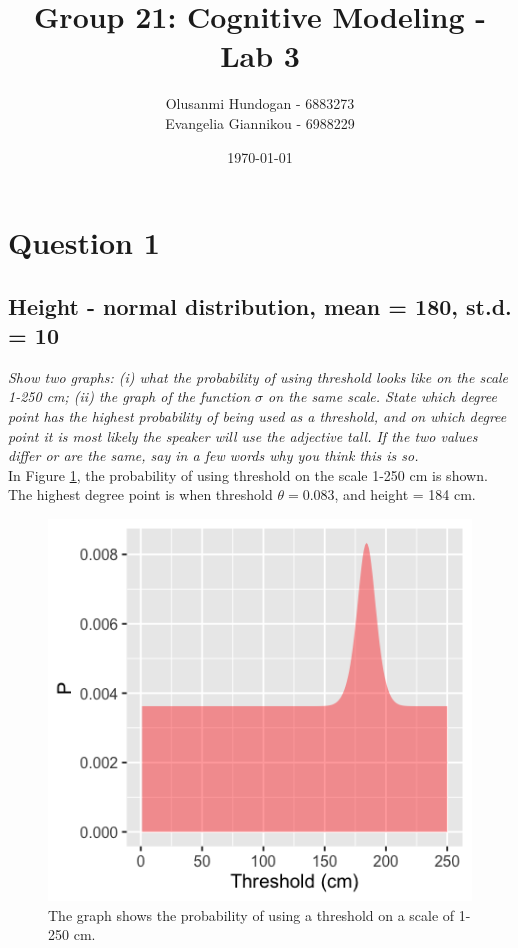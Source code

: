 \documentclass[11pt,a4paper,oneside]{article}
\title{\textbf{Group 21: Cognitive Modeling - Lab 3}}
\date{\today}
\author{Olusanmi Hundogan - 6883273\\
Evangelia Giannikou - 6988229\\
}
\begin{document}
\maketitle

\section{Question 1}
\label{Q1}
\subsection{Height - normal distribution, mean = 180, st.d. = 10}
\textit{Show two graphs: (i) what the probability of using threshold looks like on the scale 1-250 cm; (ii) the graph of the function $\sigma$ on the same scale. State which degree point has the highest probability of being used as a threshold, and on which degree point it is most likely the speaker will use the adjective tall. If the two values differ or are the same, say in a few words why you think this is so.}\\

In Figure \ref{fig:q1_threshold}, the probability of using threshold on the scale 1-250 cm is shown. The highest degree point is when threshold $ \theta = 0.083$, and height = 184 cm.

\begin{figure}[H]
    \centering
    \includegraphics[width=\textwidth]{figs/Question_1_threshold.png}
    \caption{The graph shows the probability of using a threshold on a scale of 1-250 cm.}
  \label{fig:q1_threshold}
\end{figure}
\end{document}
